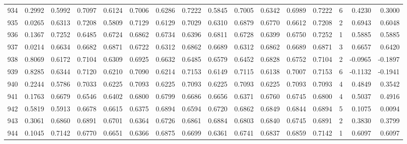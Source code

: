 \begin{tabular}{lrrrrrrrrrrrrrrr}
934 &      0.2992 &  0.5992 &  0.7097 &  0.6124 &  0.7006 &  0.6286 &  0.7222 &  0.5845 &  0.7005 &  0.6342 &   0.6989 &     0.7222 &      6 &                    0.4230 &                     0.3000 \\
935 &      0.0265 &  0.6313 &  0.7208 &  0.5809 &  0.7129 &  0.6129 &  0.7029 &  0.6310 &  0.6879 &  0.6770 &   0.6612 &     0.7208 &      2 &                    0.6943 &                     0.6048 \\
936 &      0.1367 &  0.7252 &  0.6485 &  0.6724 &  0.6862 &  0.6734 &  0.6396 &  0.6811 &  0.6728 &  0.6399 &   0.6750 &     0.7252 &      1 &                    0.5885 &                     0.5885 \\
937 &      0.0214 &  0.6634 &  0.6682 &  0.6871 &  0.6722 &  0.6312 &  0.6862 &  0.6689 &  0.6312 &  0.6862 &   0.6689 &     0.6871 &      3 &                    0.6657 &                     0.6420 \\
938 &      0.8069 &  0.6172 &  0.7104 &  0.6309 &  0.6925 &  0.6632 &  0.6485 &  0.6579 &  0.6452 &  0.6828 &   0.6752 &     0.7104 &      2 &                   -0.0965 &                    -0.1897 \\
939 &      0.8285 &  0.6344 &  0.7120 &  0.6210 &  0.7090 &  0.6214 &  0.7153 &  0.6149 &  0.7115 &  0.6138 &   0.7007 &     0.7153 &      6 &                   -0.1132 &                    -0.1941 \\
940 &      0.2244 &  0.5786 &  0.7033 &  0.6225 &  0.7093 &  0.6225 &  0.7093 &  0.6225 &  0.7093 &  0.6225 &   0.7093 &     0.7093 &      4 &                    0.4849 &                     0.3542 \\
941 &      0.1763 &  0.6679 &  0.6546 &  0.6402 &  0.6800 &  0.6799 &  0.6686 &  0.6656 &  0.6371 &  0.6760 &   0.6745 &     0.6800 &      4 &                    0.5037 &                     0.4916 \\
942 &      0.5819 &  0.5913 &  0.6678 &  0.6615 &  0.6375 &  0.6894 &  0.6594 &  0.6720 &  0.6862 &  0.6849 &   0.6844 &     0.6894 &      5 &                    0.1075 &                     0.0094 \\
943 &      0.3061 &  0.6860 &  0.6891 &  0.6701 &  0.6364 &  0.6726 &  0.6861 &  0.6884 &  0.6803 &  0.6840 &   0.6745 &     0.6891 &      2 &                    0.3830 &                     0.3799 \\
944 &      0.1045 &  0.7142 &  0.6770 &  0.6651 &  0.6366 &  0.6875 &  0.6699 &  0.6361 &  0.6741 &  0.6837 &   0.6859 &     0.7142 &      1 &                    0.6097 &                     0.6097 \\

\end{tabular}
